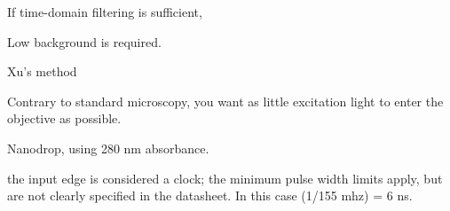 


If time-domain filtering is sufficient, 

Low background is required.

Xu's method \cite{Quantification2020}


Contrary to standard microscopy, you want as little excitation light to enter the objective as possible. 



Nanodrop, using 280 nm absorbance.


the input edge is considered a clock; the minimum pulse width limits apply, but are not clearly specified in the datasheet. In this case (1/155 mhz) = 6 ns.

